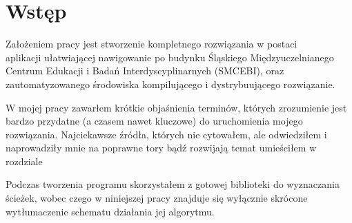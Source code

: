 \section{Wstęp}

Założeniem pracy jest stworzenie kompletnego rozwiązania w postaci \\ 
aplikacji ułatwiającej
nawigowanie po budynku Śląskiego Międzyuczelnianego Centrum Edukacji i Badań Interdyscyplinarnych (SMCEBI),
oraz zautomatyzowanego środowiska kompilującego i dystrybuującego rozwiązanie.

    W mojej pracy zawarłem krótkie objaśnienia terminów, których zrozumienie jest bardzo przydatne
(a czasem nawet kluczowe) do uruchomienia mojego rozwiązania. Najciekawsze źródła, których nie cytowałem,
ale odwiedziłem i naprowadziły mnie na poprawne tory bądź rozwijają temat umieściłem w rozdziale


    Podczas tworzenia programu skorzystałem z gotowej biblioteki do wyznaczania ścieżek,
wobec czego w niniejszej pracy znajduje się wyłącznie skrócone wytłumaczenie schematu działania
jej algorytmu.